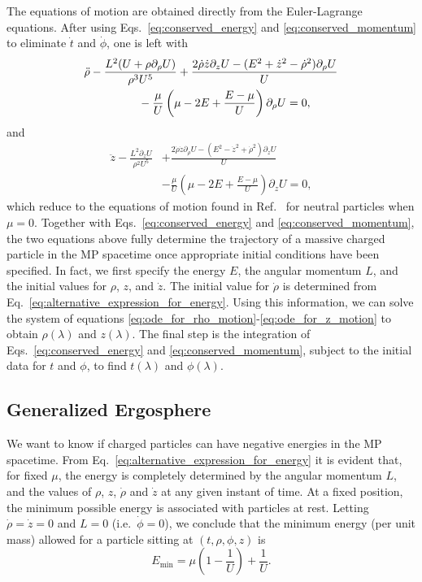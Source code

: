 The equations of motion are obtained directly from the Euler-Lagrange equations. After using Eqs.~\eqref{eq:conserved_energy} and \eqref{eq:conserved_momentum} to eliminate $\dot{t}$ and $\dot{\phi}$, one is left with
%
\begin{align}
  \ddot{\rho} & -\frac{L^2(U +\rho \partial_{\rho}U)}{\rho^3 U^5} + \frac{2\dot{\rho}\dot{z}\partial_{z}U - (E^2 + \dot{z}^2 - \dot{\rho}^2)\partial_{\rho}U}{U} \nonumber \\ & \hspace{1.5cm} - \frac{\mu}{U}\left(\mu-2 E+\frac{E-\mu}{U}\right)\partial_{\rho}U = 0,
  \label{eq:ode_for_rho_motion}
\end{align}
%
and
\begin{align}
  \ddot{z} - \frac{L^2\partial_{z}U}{\rho^2 U^5} & + \frac{2\dot{\rho}\dot{z}\partial_{\rho}U - (E^2 - \dot{z}^2 + \dot{\rho}^2)\partial_{z}U}{U} \nonumber \\ &-  \frac{\mu}{U}\left(\mu-2 E+\frac{ E-\mu}{U}\right)\partial_{z}U = 0,
  \label{eq:ode_for_z_motion}
\end{align}
which reduce to the equations of motion found in Ref.~\cite{ASSUMPCAO2018} for neutral particles when $\mu=0$. Together with Eqs.~\eqref{eq:conserved_energy} and \eqref{eq:conserved_momentum}, the two equations above fully determine the trajectory of a massive charged particle in the \ac{MP} spacetime once appropriate initial conditions have been specified. In fact, we first specify the energy $E$, the angular momentum $L$, and the initial values for $\rho$, $z$, and $\dot z$. The initial value for $\dot{\rho}$ is determined from Eq.~\eqref{eq:alternative_expression_for_energy}. Using this information, we can solve the system of equations \eqref{eq:ode_for_rho_motion}-\eqref{eq:ode_for_z_motion} to obtain $\rho(\lambda)$ and $z(\lambda)$. The final step is the integration of Eqs.~\eqref{eq:conserved_energy} and \eqref{eq:conserved_momentum}, subject to the initial data for $t$ and $\phi$, to find $t(\lambda)$ and $\phi(\lambda)$.

\subsection{Generalized Ergosphere} \label{Sec:gen_ergo}

We want to know if charged particles can have negative energies in the \ac{MP} spacetime. From Eq.~\eqref{eq:alternative_expression_for_energy} it is evident that, for fixed $\mu$, the energy is completely determined by the angular momentum $L$, and the values of $\rho$, $z$, $\dot{\rho}$ and $\dot{z}$  at any given instant of time. At a fixed position, the minimum possible energy is associated with particles at rest. Letting $\dot{\rho}=\dot{z}=0$ and $L=0$ (i.e.~$\dot{\phi}=0$), we conclude that the minimum energy (per unit mass) allowed for a particle sitting at $(t,\rho,\phi,z)$ is
\begin{equation} \label{eq:minimum_energy}
  E_{\mathrm{min}} = \mu\left(1-\frac{1}{U}\right) + \frac{1}{U}.
\end{equation}

